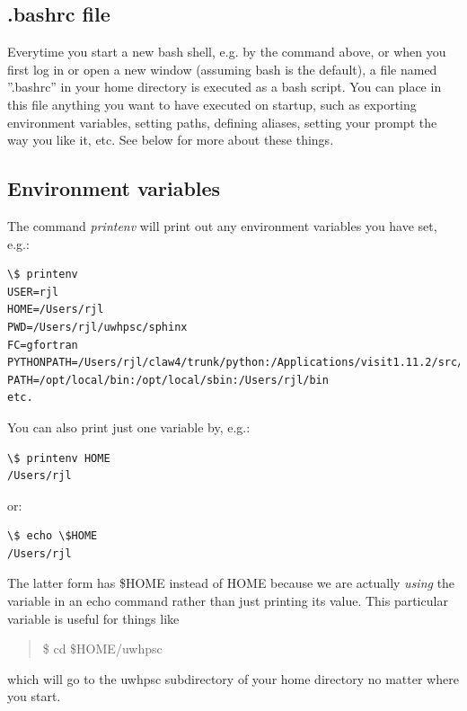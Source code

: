 \documentclass[letterpaper,10pt,english]{sphinxmanual}
\begin{document}
\subsection{.bashrc file}
\label{unix:bashrc}\label{unix:bashrc-file}
Everytime you start a new bash shell, e.g. by the command above, or when you
first log in or open a new window (assuming bash is the default), a file
named ''.bashrc'' in your home directory is executed as a bash script.  You
can place in this file anything you want to have executed on startup, such
as exporting environment variables, setting paths, defining aliases, setting
your prompt the way you like it, etc.  See below for more about these
things.


\subsection{Environment variables}
\label{unix:environment-variables}\label{unix:env}
The command \emph{printenv} will print out any environment variables you have
set, e.g.:

\begin{Verbatim}[commandchars=\\\{\}]
\$ printenv
USER=rjl
HOME=/Users/rjl
PWD=/Users/rjl/uwhpsc/sphinx
FC=gfortran
PYTHONPATH=/Users/rjl/claw4/trunk/python:/Applications/visit1.11.2/src/lib:
PATH=/opt/local/bin:/opt/local/sbin:/Users/rjl/bin
etc.
\end{Verbatim}

You can also print just one variable by, e.g.:

\begin{Verbatim}[commandchars=\\\{\}]
\$ printenv HOME
/Users/rjl
\end{Verbatim}

or:

\begin{Verbatim}[commandchars=\\\{\}]
\$ echo \$HOME
/Users/rjl
\end{Verbatim}

The latter form has \$HOME instead of HOME because we are actually \emph{using}
the variable in an echo command rather than just printing its value.  This
particular variable is useful for things like
\begin{quote}

\$ cd \$HOME/uwhpsc
\end{quote}

which will go to the uwhpsc subdirectory of your home directory no
matter where you start.
\end{document}
